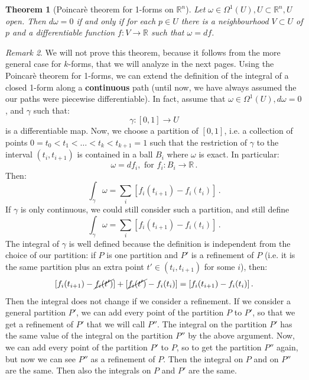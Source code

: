 \documentclass[a4paper,11pt,titlepage, article, oneside]{memoir}
\numberwithin{equation}{section}
\newtheorem{theorem}{Theorem}[section]
\theoremstyle{definition}
\theoremstyle{remark}
\newtheorem{remark}[theorem]{Remark}
\newcommand{\rfield}{\mathbb{R}}
\begin{document}
\begin{theorem}[Poincarè theorem for 1-forms on $\rfield^n$]
  Let $\omega \in \Omega^1(U), U \subset \rfield^n, U$ open. Then $d\omega = 0$ if and only if for each $p \in U$ there is a neighbourhood $V \subset U$ of $p$ and a differentiable function $f \colon V \rightarrow \rfield$ such that $\omega = df$.
\end{theorem}

\begin{remarkbox}\begin{remark}
  We will not prove this theorem, because it follows from the more general case for $k$-forms, that we will analyze in the next pages.
  Using the Poincarè theorem for 1-forms, we can extend the definition of the integral of a closed 1-form along a \textbf{continuous} path (until now, we have always assumed the our paths were piecewise differentiable). In fact, assume that $ \omega \in \Omega^1(U), d \omega = 0$, and $\gamma$ such that:
  $$\gamma \colon [0, 1] \rightarrow U$$ is a differentiable map.
  Now, we choose a partition of $[0, 1]$, i.e. a collection of points $0 = t_0 < t_1 < \ldots < t_k < t_{k+1} = 1$ such that the restriction of $\gamma$ to the interval $(t_i, t_{i+1})$ is contained in a ball $B_i$ where $\omega$ is exact. In particular:
  $$\omega = df_i, \text{ for } f_i \colon B_i \rightarrow \rfield \, .$$
  Then:
  $$\int_{\gamma} \omega = \sum_i \left[ f_i(t_{i+1}) - f_i(t_i) \right ] \, .$$
  If $\gamma$ is only continuous, we could still consider such a partition, and still define
  $$\int_{\gamma} \omega = \sum_i \left[ f_i(t_{i+1}) - f_i(t_i) \right ] \, .$$
  The integral of $\gamma$ is well defined because the definition is independent from the choice of our partition: if $P$ is one partition and $P'$ is a refinement of $P$ (i.e. it is the same partition plus an extra point $t' \in (t_i, t_{i+1})$ for some $i$), then:
  $$[f_i(t_{i+1}) - \cancel{f_i(t')}] + [\cancel{f_i(t')} - f_i(t_i)] = [f_i(t_{i+1}) - f_i(t_i)] \, .$$
  Then the integral does not change if we consider a refinement. If we consider a general partition $P'$, we can add every point of the partition $P$ to $P'$, so that we get a refinement of $P'$ that we will call $P''$. The integral on the partition $P'$ has the same value of the integral on the partition $P''$ by the above argument. Now, we can add every point of the partition $P'$ to $P$, so to get the partition $P''$ again, but now we can see $P''$ as a refinement of $P$. Then the integral on $P$ and on $P''$ are the same. Then also the integrals on $P$ and $P'$ are the same.
\end{remark}\end{remarkbox}
\end{document}
